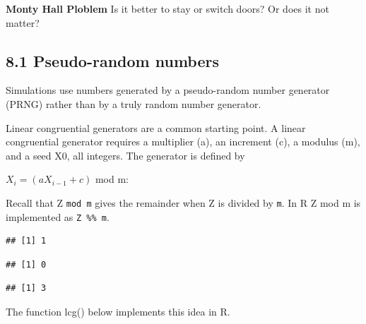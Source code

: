 \documentclass[]{article}
\newenvironment{Shaded}{\begin{snugshade}}{\end{snugshade}}
\newcommand{\DecValTok}[1]{\textcolor[rgb]{0.00,0.00,0.81}{#1}}
\newcommand{\OperatorTok}[1]{\textcolor[rgb]{0.81,0.36,0.00}{\textbf{#1}}}
\begin{document}
\textbf{Monty Hall Ploblem} Is it better to stay or switch doors? Or
does it not matter?

\subsection{8.1 Pseudo-random numbers}\label{pseudo-random-numbers}

Simulations use numbers generated by a pseudo-random number generator
(PRNG) rather than by a truly random number generator.

Linear congruential generators are a common starting point. A linear
congruential generator requires a multiplier (a), an increment (c), a
modulus (m), and a seed X0, all integers. The generator is defined by

\(X_i = (aX_{i-1} + c)\) mod m:

Recall that Z \texttt{mod\ m} gives the remainder when Z is divided by
\texttt{m}. In R Z mod m is implemented as \texttt{Z\ \%\%\ m}.

\begin{Shaded}
\end{Shaded}

\begin{verbatim}
## [1] 1
\end{verbatim}

\begin{Shaded}
\end{Shaded}

\begin{verbatim}
## [1] 0
\end{verbatim}

\begin{Shaded}
\end{Shaded}

\begin{verbatim}
## [1] 3
\end{verbatim}

The function lcg() below implements this idea in R.
\end{document}
